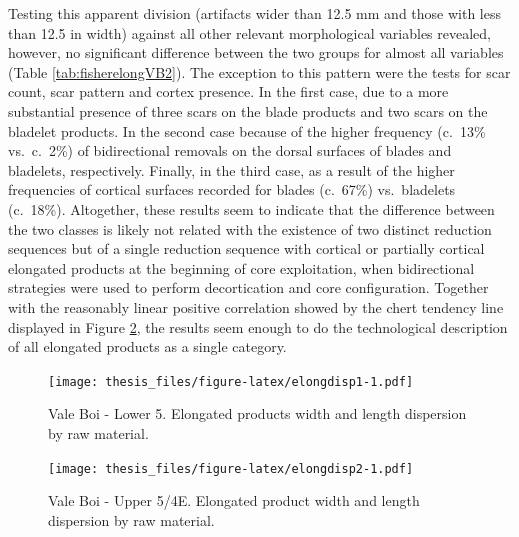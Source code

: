 \documentclass[12pt,twoside]{reedthesis}
\begin{document}
Testing this apparent division (artifacts wider than 12.5 mm and those with less than 12.5 in width) against all other relevant morphological variables revealed, however, no significant difference between the two groups for almost all variables (Table \ref{tab:fisherelongVB2}). The exception to this pattern were the tests for scar count, scar pattern and cortex presence. In the first case, due to a more substantial presence of three scars on the blade products and two scars on the bladelet products. In the second case because of the higher frequency (c.~13\% vs.~c.~2\%) of bidirectional removals on the dorsal surfaces of blades and bladelets, respectively. Finally, in the third case, as a result of the higher frequencies of cortical surfaces recorded for blades (c.~67\%) vs.~bladelets (c.~18\%). Altogether, these results seem to indicate that the difference between the two classes is likely not related with the existence of two distinct reduction sequences but of a single reduction sequence with cortical or partially cortical elongated products at the beginning of core exploitation, when bidirectional strategies were used to perform decortication and core configuration. Together with the reasonably linear positive correlation showed by the chert tendency line displayed in Figure \ref{fig:elongdisp2}, the results seem enough to do the technological description of all elongated products as a single category.
\begin{figure}
\centering
\texttt{[image: thesis\_files/figure-latex/elongdisp1-1.pdf]}
\caption{\label{fig:elongdisp1}Vale Boi - Lower 5. Elongated products width and length dispersion by raw material.}
\end{figure}
\begin{figure}
\centering
\texttt{[image: thesis\_files/figure-latex/elongdisp2-1.pdf]}
\caption{\label{fig:elongdisp2}Vale Boi - Upper 5/4E. Elongated product width and length dispersion by raw material.}
\end{figure}
\end{document}
